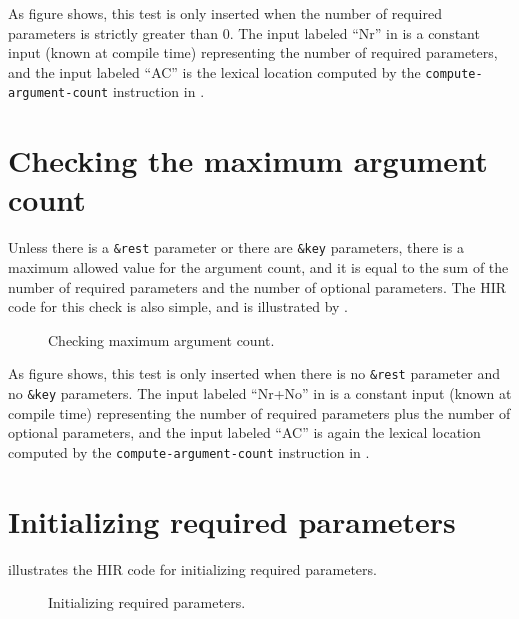 As figure  shows, this test is only
inserted when the number of required parameters is strictly greater
than $0$.  The input labeled ``Nr'' in
 is a constant input (known
at compile time) representing the number of required parameters, and
the input labeled ``AC'' is the lexical location computed by the
\texttt{compute-argument-count} instruction in
.

\section{Checking the maximum argument count}

Unless there is a \texttt{\&rest} parameter or there are
\texttt{\&key} parameters, there is a maximum allowed value for the
argument count, and it is equal to the sum of the number of required
parameters and the number of optional parameters.  The HIR code for
this check is also simple, and is illustrated by
.

\begin{figure}
\begin{center}
\end{center}
\caption{\label{fig-check-maximum-argument-count}
Checking maximum argument count.}
\end{figure}

As figure  shows, this test is only
inserted when there is no \texttt{\&rest} parameter and no
\texttt{\&key} parameters. The input labeled ``Nr+No'' in
 is a constant input (known
at compile time) representing the number of required parameters plus
the number of optional parameters, and the input labeled ``AC'' is
again the lexical location computed by the
\texttt{compute-argument-count} instruction in
.

\section{Initializing required parameters}

 illustrates the HIR code
for initializing required parameters.

\begin{figure}
\begin{center}
\end{center}
\caption{\label{fig-initialize-required-parameters}
Initializing required parameters.}
\end{figure}

